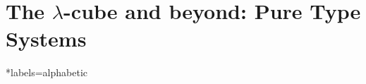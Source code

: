 \documentclass[reqno]{amsart}
\begin{document}
    \begin{definition}
        
    \end{definition}

    \begin{lemma}
        
    \end{lemma}

    \begin{theorem}

    \end{theorem}

    \section{The $\lambda$-cube and beyond: Pure Type Systems}

    \begin{definition}
        
    \end{definition}

    \begin{lemma}
        
    \end{lemma}

    \begin{theorem}
        
    \end{theorem}

    \begin{bibdiv}
        \begin{biblist}*{labels={alphabetic}}
        \end{biblist}
    \end{bibdiv}
\end{document}
